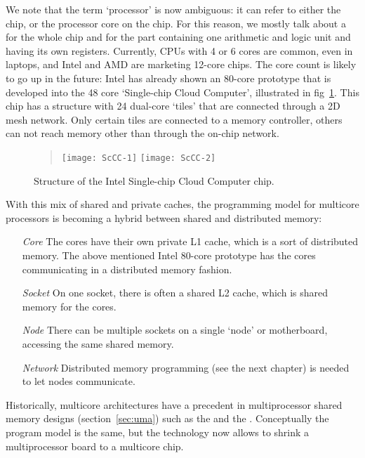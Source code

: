 We note that the term `processor' is now ambiguous: it can refer to either the
chip, or the processor core on the chip. For this reason, we mostly
talk about a  for the whole chip and
for the part containing one arithmetic and logic unit and
having its own registers. Currently, \acp{CPU} with 4 or 6 cores are
common,
even in laptops, and Intel and AMD are marketing 12-core chips.
The core count is
likely to go up in the future: Intel
has already shown an 80-core prototype that is developed into the 48
core `Single-chip Cloud Computer', illustrated in
fig~\ref{fig:rockcreek}. This chip has a structure with 24 dual-core
`tiles' that are connected through a 2D mesh network. Only certain
tiles are connected to a memory controller, others can not reach
memory other than through the on-chip network.

\begin{figure}[ht]
  \begin{quote}
  \texttt{[image: ScCC-1]}
  \texttt{[image: ScCC-2]}
  \end{quote}
  \caption{Structure of the Intel Single-chip Cloud Computer chip.}
  \label{fig:rockcreek}
\end{figure}

With
this mix of shared and private caches, the programming model for
multicore processors is becoming a hybrid between shared and
distributed memory:
\begin{itemize}
\item[{\it Core}] The cores have their own private L1 cache, which is a sort of
  distributed memory. The above mentioned Intel 80-core prototype has the
  cores communicating in a distributed memory fashion.
\item[{\it Socket}] On one socket, there is often a shared L2 cache, which is shared
  memory for the cores.
\item[{\it Node}] There can be multiple sockets on a single `node' or
  motherboard, accessing the same shared memory.
\item[{\it Network}] Distributed memory programming (see the next
  chapter) is needed to let nodes
  communicate.
\end{itemize}

Historically, multicore architectures have a precedent in
multiprocessor shared memory designs (section~\ref{sec:uma}) such as
the  and the . Conceptually the program model is the same, but the
technology now allows to shrink a multiprocessor board to a multicore
chip.

